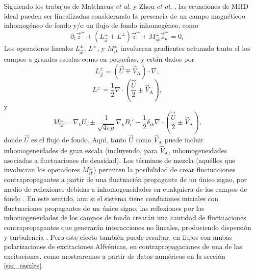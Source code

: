 Siguiendo los trabajos de Matthaeus {\it et al.}
\cite{matthaeus1994transport} y Zhou {\it et al.}
\cite{zhou1990remarks}, las ecuaciones de MHD ideal pueden ser
linealizadas considerando la presencia de un campo magnéticoo
inhomogéneo de fondo y/o un flujo de fondo inhomogéneo, como
\begin{equation}\label{eq:MHD_zpzm}
  \partial_t \vec{z}^\pm
  + \left( L^\pm_\vec{x} + L^\pm \right) \vec{z}^\pm
  + M^\pm_{ik} \vec{z}^\mp_k
  = 0,
\end{equation}
Los operadores lineales $L^\pm_\vec{x}$, $L^\pm$, y $M^\pm_{ik}$
involucran gradientes actuando tanto el los campos a grandes escalas
como en pequeñas, y están dados por
\begin{equation}\label{eq:MHD_Lx}
  L^\pm_\vec{x} = \left( \vec{U} \mp \vec{V}_\textrm{A} \right) \cdot \nabla ,
\end{equation}
\begin{equation}\label{eq:MHD_L}
  L^\pm = \frac{1}{2} \nabla \cdot \left( \frac{\vec{U}}{2} \pm \vec{V}_\textrm{A} 
  \right) ,
\end{equation}
y
\begin{equation}\label{eq:MHD_Mik}
  M^\pm_{ik} = \nabla_k U_i \pm \frac{1}{\sqrt{4\pi\rho}} \nabla_k B_i'
  - \frac{1}{2} \delta_{ik} \nabla\cdot \left( \frac{\vec{U}}{2} \pm
  \vec{V}_\textrm{A} \right) ,
\end{equation}
donde $\vec{U}$ es el flujo de fondo. Aquí, tanto $\vec{U}$ como
$\vec{V}_\textrm{A}$ puede incluir inhomogeneidades de gran escala
(incluyendo, para $\vec{V}_\textrm{A}$, inhomogeneidades asociadas a
fluctuaciones de densidad).  Los términos de mezcla (aquéllos que
involucran los operadores $M_{ik}^\pm$) permiten la posibilidad de
crear fluctuaciones contrapropagantes a partir de una fluctuación
propagante de un único signo, por medio de reflexiones debidas a
inhomogeneidades en cualquiera de los campos de fondo
\cite{velli_1993_propagation}.  En este sentido, aun si el sistema
tiene condiciones iniciales con fluctuaciones propagantes de un único
signo, las reflexiones por las inhomogeneidades de los campos de fondo
crearán una cantidad de fluctuaciones contrapropagantes que generarán
interacciones no lineales, produciendo dispersión y turbulencia
\cite{matthaeus_1999_coronal, dmitruk_2001_coronal}. Pero este efecto
también puede resultar, en flujos con ambas polarizaciones de
excitaciones Alfvénicas, en contrapropagaciones de una de las
excitaciones, como mostraremos a partir de datos numéricos en la
sección \ref{sec_results}.

